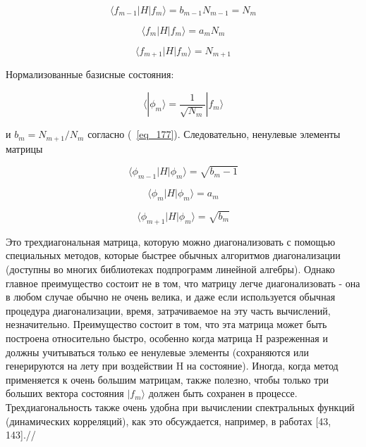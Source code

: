 \documentclass[11pt]{article}
\begin{document}
\begin{equation*}
\langle f_{m-1}|H|f_m\rangle = b_{m-1}N_{m-1} = N_m
\end{equation*}

\begin{equation}
\langle f_m|H|f_m\rangle = a_m N_m
\label{eq_180}
\end{equation}

\begin{equation*}
\langle f_{m+1}|H|f_m\rangle = N_{m+1}
\end{equation*}

Нормализованные базисные состояния:

\begin{equation}
\langle |\phi_m \rangle = \frac{1}{\sqrt{N_m}}|f_m \rangle
\label{eq_181}
\end{equation}

и $b_m = N_{m + 1} / N_m$ согласно (~\ref{eq_177}). Следовательно, ненулевые элементы матрицы

\begin{equation*}
\langle \phi_{m-1}|H|\phi_m\rangle = \sqrt{b_m-1}
\end{equation*}


\begin{equation}
\langle \phi_m|H|\phi_m\rangle = a_m
\label{eq_186}
\end{equation}

\begin{equation*}
\langle \phi_{m+1}|H|\phi_m\rangle = \sqrt{b_m}
\end{equation*}

Это трехдиагональная матрица, которую можно диагонализовать с помощью специальных методов, которые быстрее обычных алгоритмов диагонализации (доступны во многих библиотеках подпрограмм линейной алгебры). Однако главное преимущество состоит не в том, что матрицу легче диагонализовать - она в любом случае обычно не очень велика, и даже если используется обычная процедура диагонализации, время, затрачиваемое на эту часть вычислений, незначительно. Преимущество состоит в том, что эта матрица может быть построена относительно быстро, особенно когда матрица H разреженная и должны учитываться только ее ненулевые элементы (сохраняются или генерируются на лету при воздействии H на состояние). Иногда, когда метод применяется к очень большим матрицам, также полезно, чтобы только три больших вектора состояния $| f_m \rangle $ должен быть сохранен в процессе. Трехдиагональность также очень удобна при вычислении спектральных функций (динамических корреляций), как это обсуждается, например, в работах [43, 143].//
\end{document}
